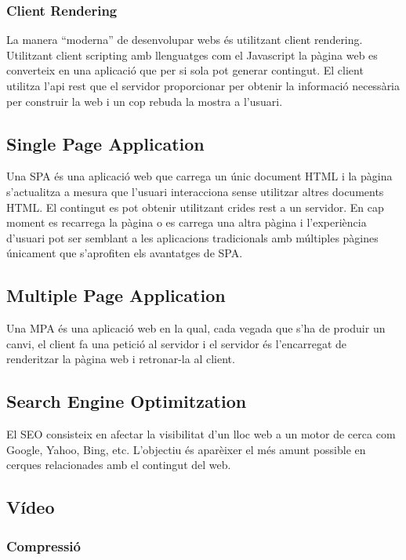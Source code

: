 \documentclass[12pt, titlepage]{article}
\begin{document}
\subsubsection{Client Rendering}
La manera “moderna” de desenvolupar webs és utilitzant client rendering.
Utilitzant client scripting amb llenguatges com el Javascript la pàgina web es
converteix en una aplicació que per si sola pot generar contingut. El
client utilitza l’api rest que el servidor proporcionar per obtenir la
informació necessària per construir la web i un cop rebuda la mostra a l’usuari.

\subsection{Single Page Application}

Una SPA és una aplicació web que carrega un únic document HTML i la pàgina
s’actualitza a mesura que l’usuari interacciona sense utilitzar altres documents
HTML. El contingut es pot obtenir utilitzant crides rest a un servidor. En cap
moment es recarrega la pàgina o es carrega una altra pàgina i l’experiència
d’usuari pot ser semblant a les aplicacions tradicionals amb múltiples pàgines
únicament que s’aprofiten els avantatges de SPA.

\subsection{Multiple Page Application}

Una MPA és una aplicació web en la qual, cada vegada que s’ha de produir un
canvi, el client fa una petició al servidor i el servidor és l’encarregat de
renderitzar la pàgina web i retronar-la al client.

\subsection{Search Engine Optimitzation}
El SEO consisteix en afectar la visibilitat d’un lloc web a un motor de cerca com
Google, Yahoo,  Bing, etc. L’objectiu és aparèixer el més amunt possible en cerques
relacionades amb el contingut del web.

\subsection{Vídeo}

\subsubsection{Compressió}
\end{document}
